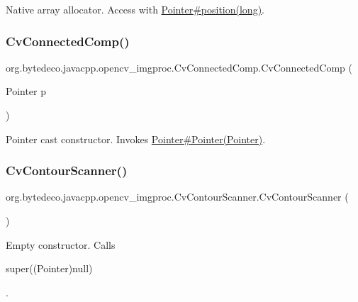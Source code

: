 Native array allocator. Access with \hyperlink{}{Pointer\#position(long)}. \mbox{\label{group__imgproc_gae571423a672ebb676a5e859ce17ec64a}} 
\subsubsection{\texorpdfstring{Cv\+Connected\+Comp()}{CvConnectedComp()}\hspace{0.1cm}{\footnotesize\ttfamily [3/3]}}
{\footnotesize\ttfamily org.\+bytedeco.\+javacpp.\+opencv\+\_\+imgproc.\+Cv\+Connected\+Comp.\+Cv\+Connected\+Comp (\begin{DoxyParamCaption}\item[{Pointer}]{p }\end{DoxyParamCaption})\hspace{0.3cm}{\ttfamily [inline]}}

Pointer cast constructor. Invokes \hyperlink{}{Pointer\#\+Pointer(\+Pointer)}. \mbox{\label{group__imgproc_ga48b4cf9a3994507c18e9b8fedf2150aa}} 
\subsubsection{\texorpdfstring{Cv\+Contour\+Scanner()}{CvContourScanner()}\hspace{0.1cm}{\footnotesize\ttfamily [1/2]}}
{\footnotesize\ttfamily org.\+bytedeco.\+javacpp.\+opencv\+\_\+imgproc.\+Cv\+Contour\+Scanner.\+Cv\+Contour\+Scanner (\begin{DoxyParamCaption}{ }\end{DoxyParamCaption})\hspace{0.3cm}{\ttfamily [inline]}}

Empty constructor. Calls
\begin{DoxyCode}
super((Pointer)null) 
\end{DoxyCode}
 . \mbox{\label{group__imgproc_gacbac8305251f626940351e7e95e6b69a}} 
